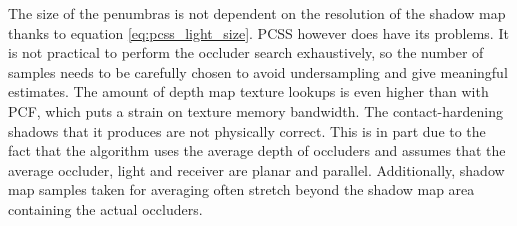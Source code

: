 The size of the penumbras is not dependent on the resolution of the shadow map thanks to equation \ref{eq:pcss_light_size}. PCSS however does have its problems. It is not practical to perform the occluder search exhaustively, so the number of samples needs to be carefully chosen to avoid undersampling and give meaningful estimates. The amount of depth map texture lookups is even higher than with PCF, which puts a strain on texture memory bandwidth. The contact-hardening shadows that it produces are not physically correct. This is in part due to the fact that the algorithm uses the average depth of occluders and assumes that the average occluder, light and receiver are planar and parallel. Additionally, shadow map samples taken for averaging often stretch beyond the shadow map area containing the actual occluders.









